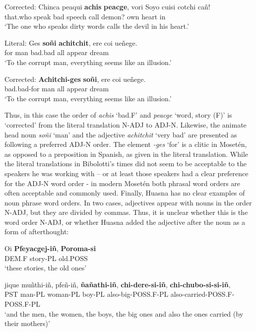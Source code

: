 \documentclass[output=paper,colorlinks,citecolor=brown
]{langscibook}
\begin{document}
Corrected:
\ea \label{sakel_example_16}
\gll Chinca  peaqui  \textbf{achis}  \textbf{peacge},  vori    Soyo   cuisi   cotchi  cañ!\\
     that.who   speak    bad    speech	call   demon?  own heart   in\\
\glt ‘The one who speaks dirty words calls the devil in his heart.’
\z	

Literal:
\ea \label{sakel_example_17}
\gll Ges \textbf{soñi} \textbf{achitchit}, ere coi ueñege.\\
     for    man bad.bad all appear  dream\\
\glt ‘To the corrupt man, everything seems like an illusion.’
\z	

Corrected:
\ea \label{sakel_example_18}
\gll \textbf{Achitchi-ges} \textbf{soñi}, ere coi ueñege.\\
     bad.bad-for    man all appear  dream\\
\glt ‘To the corrupt man, everything seems like an illusion.’
\z	

Thus, in this case the order of \textit{achis} ‘bad.F’ and \textit{peacge} ‘word, story (F)’ is ‘corrected’ from the literal translation N-ADJ to ADJ-N. Likewise, the animate head noun \textit{soñi} ‘man’ and the adjective \textit{achitchit} ‘very bad’ are presented as following a preferred ADJ-N order. The element \textit{-ges} ‘for’ is a clitic in Mosetén, as opposed to a preposition in Spanish, as given in the literal translation.
While the literal translations in Bibolotti’s times did not seem to be acceptable to the speakers he was working with – or at least those speakers had a clear preference for the ADJ-N word order - in modern Mosetén both phrasal word orders are often acceptable and commonly used.	
Finally, Huasna has no clear examples of noun phrase word orders. In two cases, adjectives appear with nouns in the order N-ADJ, but they are divided by commas. Thus, it is unclear whether this is the word order N-ADJ, or whether Huasna added the adjective after the noun as a form of afterthought:

\ea \label{sakel_example_19}
\gll Oi 		\textbf{Pfeyacgej-iñ}, 		\textbf{Poroma-si}\\
     \textsc{DEM}.\textsc{F}	story-\textsc{PL}		old.\textsc{POSS}\\
\glt ‘these stories, the old ones’
\z	

\ea \label{sakel_example_20}
\gll jique	muñthi-iñ,	pfeñ-iñ,	\textbf{ñañathi-iñ},  \textbf{chi-dere-si-iñ},		\textbf{chi-chubo-si-si-iñ},\\
     	\textsc{PST}	man-\textsc{PL}	woman-\textsc{PL}	boy-\textsc{PL}	also-big-\textsc{POSS.F-PL}	also-carried-\textsc{POSS.F-POSS.F-PL}\\
\glt ‘and the men, the women, the boys, the big ones and also the ones carried (by their mothers)’
\z	
	
\end{document}
